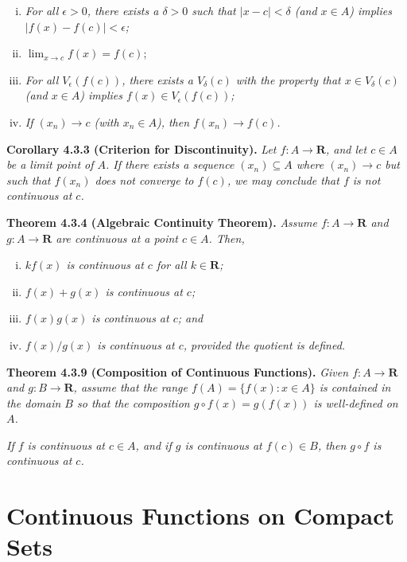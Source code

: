 \documentclass[12pt]{report}
\newcommand{\R}{\textbf{R}}
\begin{document}
\begin{enumerate}[(i)]
\item \textit{For all $\epsilon>0$, there exists a $\delta>0$ such that $|x-c|<\delta$ (and $x\in A$) implies $|f(x)-f(c)|<\epsilon$;}
\item $\lim_{x\rightarrow c}f(x)=f(c)$;
\item \textit{For all $V_\epsilon(f(c))$, there exists a $V_\delta(c)$ with the property that $x\in V_\delta(c)$ (and $x\in A$) implies $f(x)\in V_\epsilon(f(c))$;}
\item \textit{If $(x_n)\rightarrow c$ (with $x_n\in A$), then $f(x_n)\rightarrow f(c)$.}
\end{enumerate}
\bigskip

\noindent \textbf{Corollary 4.3.3 (Criterion for Discontinuity).} \textit{Let $f:A\rightarrow\R$, and let $c\in A$ be a limit point of $A$.  If there exists a sequence $(x_n)\subseteq A$ where $(x_n)\rightarrow c$ but such that $f(x_n)$ does not converge to $f(c)$, we may conclude that $f$ is not continuous at $c$.}
\bigskip

\noindent \textbf{Theorem 4.3.4 (Algebraic Continuity Theorem).} \textit{Assume $f:A\rightarrow\R$ and $g:A\rightarrow\R$ are continuous at a point $c\in A$.  Then,}

\begin{enumerate}[(i)]
\item \textit{$kf(x)$ is continuous at $c$ for all $k\in\R$;}
\item \textit{$f(x)+g(x)$ is continuous at $c$;}
\item \textit{$f(x)g(x)$ is continuous at $c$; and}
\item \textit{$f(x)/g(x)$ is continuous at $c$, provided the quotient is defined.}
\end{enumerate}
\bigskip

\noindent \textbf{Theorem 4.3.9 (Composition of Continuous Functions).} \textit{Given $f:A\rightarrow\R$ and $g:B\rightarrow\R$, assume that the range $f(A)=\{f(x):x\in A\}$ is contained in the domain $B$ so that the composition $g\circ f(x)=g(f(x))$ is well-defined on $A$.}

\textit{If $f$ is continuous at $c\in A$, and if $g$ is continuous at $f(c)\in B$, then $g\circ f$ is continuous at $c$.}
\bigskip

\section{Continuous Functions on Compact Sets}
\end{document}
